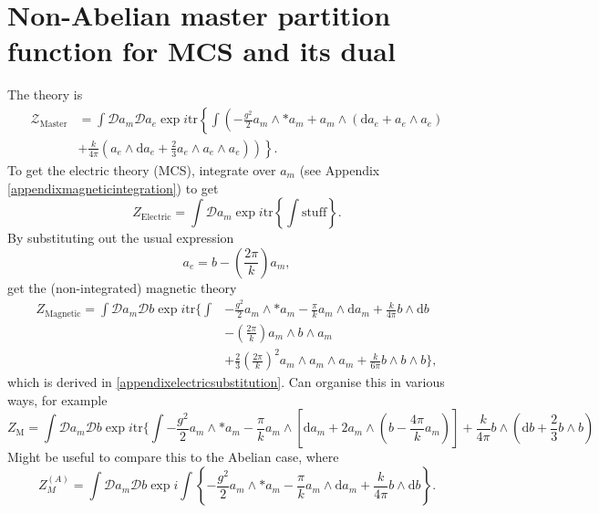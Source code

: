 \documentclass{article}
\begin{document}
\section{Non-Abelian master partition function for MCS and its dual}
The theory is
\begin{align}
    \label{Eq: Master equation}
    \mathcal{Z}_{\text{Master}}&= \int \mathcal{D}a_{m}\mathcal{D}a_{e}\exp i \text{tr}\left\{\int \left(-\frac{g^{2}}{2}a_{m}\wedge * a_{m} \right.\right. + a_{m}\wedge \left(\mathrm{d}a_{e} + a_{e}\wedge a_{e} \right) \nonumber \\
    &+ \left.\left.\frac{k}{4\pi}\left(a_{e}\wedge \mathrm{d}a_{e} + \frac{2}{3}a_{e}\wedge a_{e}\wedge a_{e} \right)\right)\right\}.
\end{align}
To get the electric theory (MCS), integrate over $a_{m}$ (see Appendix \ref{appendixmagneticintegration}) to get
\begin{equation}
    Z_{\text{Electric}} = \int \mathcal{D}a_{m}\exp i \text{tr}\left\{\int \text{stuff}\right\}.
\end{equation}
By substituting out the usual expression
\begin{equation}
    a_{e} = b - \left(\frac{2\pi}{k} \right)a_{m}, 
\end{equation}
get the (non-integrated) magnetic theory
\begin{align}
    Z_{\text{Magnetic}} = \int \mathcal{D}a_{m}\mathcal{D}b \exp i \text{tr}\bigg\{\int &-\frac{g^{2}}{2}a_{m}\wedge *a_{m} - \frac{\pi}{k}a_{m}\wedge \mathrm{d}a_{m} + \frac{k}{4\pi}b\wedge \mathrm{d}b \nonumber\\
    &- \left(\frac{2\pi}{k}\right)a_{m}\wedge b \wedge a_{m}\nonumber\\
    &+ \frac{2}{3}\left(\frac{2\pi}{k}\right)^{2}a_{m}\wedge a_{m}\wedge a_{m}+ \frac{k}{6\pi}b\wedge b \wedge b\bigg\},
\end{align}
which is derived in \ref{appendixelectricsubstitution}. Can organise this in various ways, for example
\begin{equation}
    \boxed{
    Z_{\text{M}} = \int \mathcal{D}a_{m}\mathcal{D}b\exp i \text{tr}\bigg\{\int -\frac{g^{2}}{2}a_{m}\wedge *a_{m} - \frac{\pi}{k}a_{m}\wedge \left[\mathrm{d}a_{m}+2a_{m}\wedge \left(b - \frac{4\pi}{k}a_{m}\right)\right] + \frac{k}{4\pi}b\wedge \left(\mathrm{d}b + \frac{2}{3}b\wedge b\right)
    }
\end{equation}
Might be useful to compare this to the Abelian case, where
\begin{equation}
    Z_{M}^{(A)} = \int \mathcal{D}a_{m}\mathcal{D}b \exp i \int \left\{-\frac{g^{2}}{2}a_{m}\wedge *a_{m} - \frac{\pi}{k}a_{m}\wedge \mathrm{d}a_{m} + \frac{k}{4\pi}b\wedge \mathrm{d}b\right\}.
\end{equation}
\end{document}
